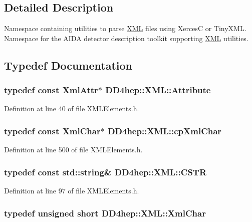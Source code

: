 \subsection{Detailed Description}
Namespace containing utilities to parse \hyperlink{namespace_d_d4hep_1_1_x_m_l}{XML} files using XercesC or TinyXML. Namespace for the AIDA detector description toolkit supporting \hyperlink{namespace_d_d4hep_1_1_x_m_l}{XML} utilities. 

\subsection{Typedef Documentation}
\hypertarget{namespace_d_d4hep_1_1_x_m_l_a5c19b7116be99d69b4b22d911357baaf}{
\subsubsection[{Attribute}]{\setlength{\rightskip}{0pt plus 5cm}typedef const XmlAttr$\ast$ {\bf DD4hep::XML::Attribute}}}
\label{namespace_d_d4hep_1_1_x_m_l_a5c19b7116be99d69b4b22d911357baaf}


Definition at line 40 of file XMLElements.h.\hypertarget{namespace_d_d4hep_1_1_x_m_l_a55d8459973c11d7c20ba5a1d7ef1242c}{
\subsubsection[{cpXmlChar}]{\setlength{\rightskip}{0pt plus 5cm}typedef const {\bf XmlChar}$\ast$ {\bf DD4hep::XML::cpXmlChar}}}
\label{namespace_d_d4hep_1_1_x_m_l_a55d8459973c11d7c20ba5a1d7ef1242c}


Definition at line 500 of file XMLElements.h.\hypertarget{namespace_d_d4hep_1_1_x_m_l_a4b167ca6b4f6763654721aef89a7089c}{
\subsubsection[{CSTR}]{\setlength{\rightskip}{0pt plus 5cm}typedef const std::string\& {\bf DD4hep::XML::CSTR}}}
\label{namespace_d_d4hep_1_1_x_m_l_a4b167ca6b4f6763654721aef89a7089c}


Definition at line 97 of file XMLElements.h.\hypertarget{namespace_d_d4hep_1_1_x_m_l_a09e5d9cc86ed782f6826dfe0778c1815}{
\subsubsection[{XmlChar}]{\setlength{\rightskip}{0pt plus 5cm}typedef unsigned short {\bf DD4hep::XML::XmlChar}}}
\label{namespace_d_d4hep_1_1_x_m_l_a09e5d9cc86ed782f6826dfe0778c1815}


